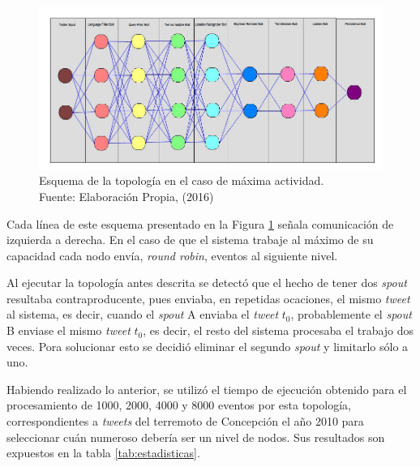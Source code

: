 \begin{figure}[H]
	\centering
	\captionsetup{justification=centering}
	\includegraphics[scale=0.5]{images/ImplementacionTopologia1.2.png}
	\caption[Esquema de la topología en el caso de máxima actividad.]{Esquema de la topología en el caso de máxima actividad.\\Fuente: Elaboración Propia, (2016)}
	\label{fig:Implementacion1p2}
\end{figure}

Cada línea de este esquema presentado en la Figura \ref{fig:Implementacion1p2} señala comunicación de izquierda a derecha. En el caso de que el sistema trabaje al máximo de su capacidad cada nodo envía, \textit{round robin}, eventos al siguiente nivel.

Al ejecutar la topología antes descrita se detectó que el hecho de tener dos \textit{spout} resultaba contraproducente, pues enviaba, en repetidas ocaciones, el mismo \textit{tweet} al sistema, es decir, cuando el \textit{spout} A enviaba el \textit{tweet}  $t_{0}$, probablemente el \textit{spout} B enviase el mismo \textit{tweet}  $t_{0}$, es decir, el resto del sistema procesaba el trabajo dos veces. Pora solucionar esto se decidió eliminar el segundo \textit{spout} y limitarlo sólo a uno.

Habiendo realizado lo anterior, se utilizó el tiempo de ejecución obtenido para el procesamiento de 1000, 2000, 4000 y 8000 eventos por esta topología, correspondientes a \textit{tweets} del terremoto de Concepción el año 2010 para seleccionar cuán numeroso debería ser un nivel de nodos. Sus resultados son expuestos en la tabla \ref{tab:estadisticas}.

